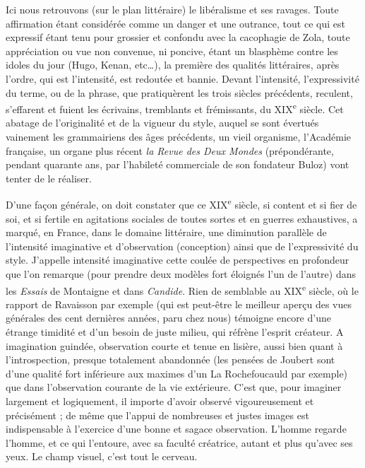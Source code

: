 \documentclass[french,twoside]{book} %
\begin{document}
Ici nous retrouvons (sur le plan littéraire) le libéralisme et ses ravages. Toute affirmation étant considérée comme un danger et une outrance, tout ce qui est expressif étant tenu pour grossier et confondu avec la cacophagie de Zola, toute appréciation ou vue non convenue, ni poncive, étant un blasphème contre les idoles du jour (Hugo, Kenan, etc…), la première des qualités littéraires, après l’ordre, qui est l’intensité, est redoutée et bannie. Devant l’intensité, l’expressivité du terme, ou de la phrase, que pratiquèrent les trois siècles précédents, reculent, s’effarent et fuient les écrivains, tremblants et frémissants, du XIX\textsuperscript{e} siècle. Cet abatage de l’originalité et de la vigueur du style, auquel se sont évertués vainement les grammairiens des âges précédents, un vieil organisme, l’Académie française, un organe plus récent {\itshape la Revue des Deux Mondes} (prépondérante, pendant quarante ans, par l’habileté commerciale de son fondateur Buloz) vont tenter de le réaliser.\par
D’une façon générale, on doit constater que ce XIX\textsuperscript{e} siècle, si content et si fier de soi, et si fertile en agitations sociales de toutes sortes et en guerres exhaustives, a marqué, en France, dans le domaine littéraire, une diminution parallèle de l’intensité imaginative et d’observation (conception) ainsi que de l’expressivité du style. J’appelle intensité imaginative cette coulée de perspectives en profondeur que l’on remarque (pour prendre deux modèles fort éloignés l’un de l’autre) dans les {\itshape Essais} de Montaigne et dans {\itshape Candide}. Rien de semblable au XIX\textsuperscript{e} siècle, où le rapport de Ravaisson par exemple (qui est peut-être le meilleur aperçu des vues générales des cent dernières années, paru chez nous) témoigne encore d’une étrange timidité et d’un besoin de juste milieu, qui réfrène l’esprit créateur. A imagination guindée, observation courte et tenue en lisière, aussi bien quant à l’introspection, presque totalement abandonnée (les pensées de Joubert sont d’une qualité fort inférieure aux maximes d’un La Rochefoucauld par exemple) que dans l’observation courante de la vie extérieure. C’est que, pour imaginer largement et logiquement, il importe d’avoir observé vigoureusement et précisément ; de même que l’appui de nombreuses et justes images est indispensable à l’exercice d’une bonne et sagace observation. L’homme regarde l’homme, et ce qui l’entoure, avec sa faculté créatrice, autant et plus qu’avec ses yeux. Le champ visuel, c’est tout le cerveau.\par
\end{document}
